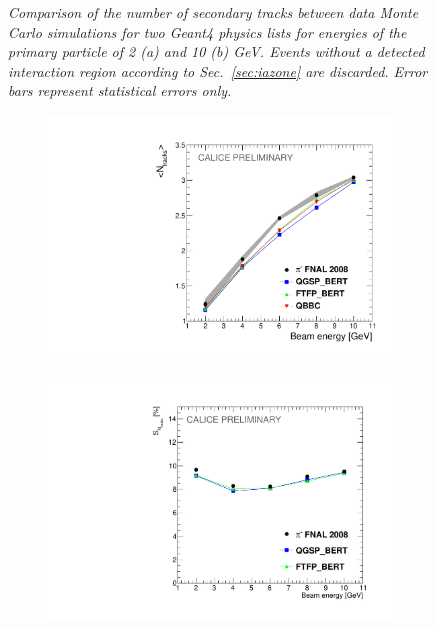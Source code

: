 \begin{figure}
\begin{subfigure}{0.5\textwidth}
		\caption{\label{fig:tr10} }
	\end{subfigure}
	\caption{\label{fig:trackexample} \sl Comparison of the number of secondary tracks between data Monte Carlo simulations for two {\sc Geant}4 physics lists  for energies of the primary particle of 2 (a) and 10 (b) GeV. Events without a detected interaction region according to Sec.~\ref{sec:iazone} are discarded. Error bars represent statistical errors only.}
\end{figure}

\begin{figure}
	\centering
	\begin{subfigure}{0.5\textwidth}
		\centering
		\includegraphics[width=.90\linewidth]{ECAL/plots/ntracks-graph.pdf}
		\caption{\label{fig:tracksgraph} }
	\end{subfigure}%
	\begin{subfigure}{0.5\textwidth}
		\centering
		\includegraphics[width=.90\linewidth]{ECAL/plots/delta-ntracks-graph.pdf}

\end{subfigure}
\end{figure}
